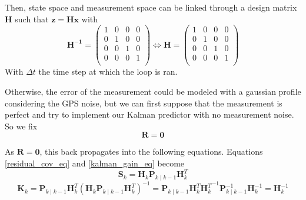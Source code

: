 \documentclass[12pt]{article}
\begin{document}
Then, state space and measurement space can be linked through a design matrix $\mathbf{H}$ such that $\mathbf{z} = \mathbf{H}\mathbf{x}$ with
\begin{equation}
\mathbf{H^{-1}} =
    \begin{pmatrix}
        1 & 0 & 0 & 0 \\
        0 & 1 & 0 & 0 \\
        0 & 0 & 1 & 0 \\
        0 & 0 & 0 & 1 \\
    \end{pmatrix}
\iff
\mathbf{H} =
    \begin{pmatrix}
        1 & 0 & 0 & 0 \\
        0 & 1 & 0 & 0 \\
        0 & 0 & 1 & 0 \\
        0 & 0 & 0 & 1 \\
    \end{pmatrix}
\end{equation}
With $\Delta{t}$ the time step at which the loop is ran.

Otherwise, the error of the measurement could be modeled with a gaussian profile considering the GPS noise, but we can first suppose that the measurement is perfect and try to implement our Kalman predictor with no measurement noise.
So we fix
\begin{equation}
\mathbf{R} = \mathbf{0}
\end{equation}

As $\mathbf{R} = \mathbf{0}$, this back propagates into the following equations.
Equations \ref{residual_cov_eq} and \ref{kalman_gain_eq} become
\begin{equation}
\mathbf{S}_k = \mathbf{H}_k \mathbf{P}_{k\mid k-1} \mathbf{H}_k^T
\label{res_cov_matrix_mod_eq}
\end{equation}
\begin{equation}
\mathbf{K}_k
= \mathbf{P}_{k\mid k-1}\mathbf{H}_k^T (\mathbf{H}_k \mathbf{P}_{k\mid k-1} \mathbf{H}_k^T)^{-1}
= \mathbf{P}_{k\mid k-1}\mathbf{H}_k^T {\mathbf{H}_k^T}^{-1} \mathbf{P}_{k\mid k-1}^{-1} \mathbf{H}_k^{-1}
= \mathbf{H}_k^{-1}
\label{kalman_gain_mod_eq}
\end{equation}
\end{document}
